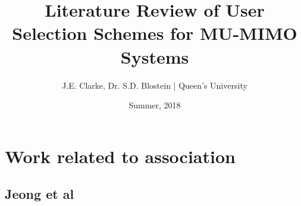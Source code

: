 \documentclass[11pt]{report}
\title{Literature Review of User Selection Schemes for MU-MIMO Systems}
\author{J.E. Clarke, Dr. S.D. Blostein | Queen's University}
\date{Summer, 2018}
\begin{document}
	\maketitle
	\newpage
    \section{Work related to association}
    	\subsection{Jeong et al}
    	
	\newpage	
 	\begingroup
 		\renewcommand{\section}[2]{}%
 		
 		
 	\endgroup
\end{document}
